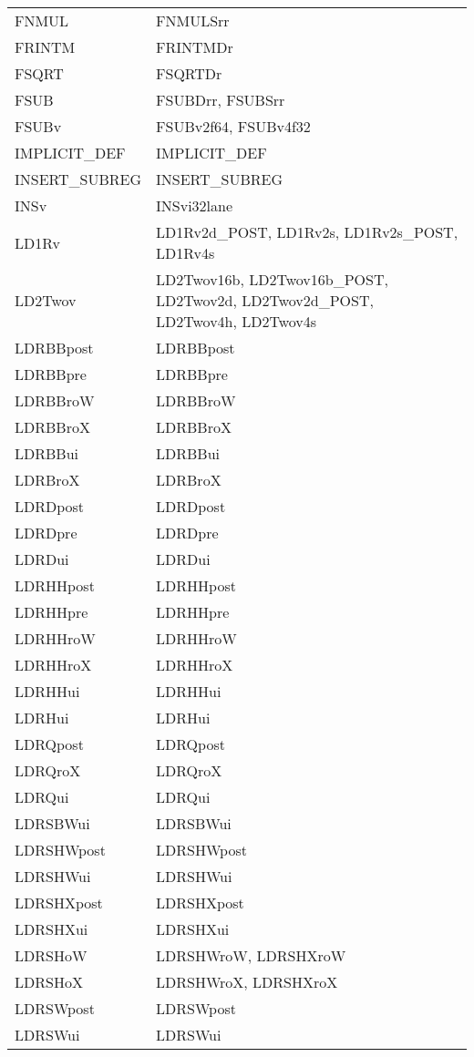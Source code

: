 \begin{xltabular}{\textwidth}{lX}
    FNMUL & FNMULSrr \\
    FRINTM & FRINTMDr \\
    FSQRT & FSQRTDr \\
    FSUB & FSUBDrr, FSUBSrr \\
    FSUBv & FSUBv2f64, FSUBv4f32 \\
    IMPLICIT\_DEF & IMPLICIT\_DEF \\
    INSERT\_SUBREG & INSERT\_SUBREG \\
    INSv & INSvi32lane \\
    LD1Rv & LD1Rv2d\_POST, LD1Rv2s, LD1Rv2s\_POST, LD1Rv4s \\
    LD2Twov & LD2Twov16b, LD2Twov16b\_POST, LD2Twov2d, LD2Twov2d\_POST, LD2Twov4h, LD2Twov4s \\
    LDRBBpost & LDRBBpost \\
    LDRBBpre & LDRBBpre \\
    LDRBBroW & LDRBBroW \\
    LDRBBroX & LDRBBroX \\
    LDRBBui & LDRBBui \\
    LDRBroX & LDRBroX \\
    LDRDpost & LDRDpost \\
    LDRDpre & LDRDpre \\
    LDRDui & LDRDui \\
    LDRHHpost & LDRHHpost \\
    LDRHHpre & LDRHHpre \\
    LDRHHroW & LDRHHroW \\
    LDRHHroX & LDRHHroX \\
    LDRHHui & LDRHHui \\
    LDRHui & LDRHui \\
    LDRQpost & LDRQpost \\
    LDRQroX & LDRQroX \\
    LDRQui & LDRQui \\
    LDRSBWui & LDRSBWui \\
    LDRSHWpost & LDRSHWpost \\
    LDRSHWui & LDRSHWui \\
    LDRSHXpost & LDRSHXpost \\
    LDRSHXui & LDRSHXui \\
    LDRSHoW & LDRSHWroW, LDRSHXroW \\
    LDRSHoX & LDRSHWroX, LDRSHXroX \\
    LDRSWpost & LDRSWpost \\
    LDRSWui & LDRSWui \\

\end{xltabular}
